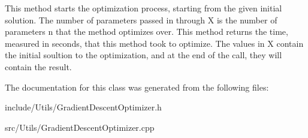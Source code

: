 This method starts the optimization process, starting from the given initial solution. The number of parameters passed in through X is the number of parameters n that the method optimizes over. This method returns the time, measured in seconds, that this method took to optimize. The values in X contain the initial soultion to the optimization, and at the end of the call, they will contain the result. 

The documentation for this class was generated from the following files:\begin{DoxyCompactItemize}
\item 
include/Utils/GradientDescentOptimizer.h\item 
src/Utils/GradientDescentOptimizer.cpp\end{DoxyCompactItemize}
